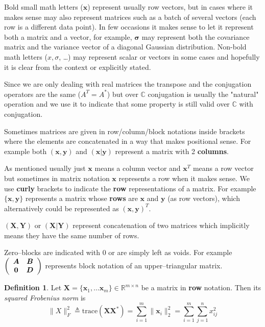 \documentclass[11pt, a4paper]{report}
\theoremstyle{plain}
\theoremstyle{definition}
\newtheorem{mydef}{Definition}[chapter]
\theoremstyle{remark}
\newcommand{\C}{\mathbb{C}}
\newcommand{\R}{\mathbb{R}}
\newcommand{\X}{\mathbf{X}}
\newcommand{\x}{\mathbf{x}}
\newcommand{\Y}{\mathbf{Y}}
\newcommand{\y}{\mathbf{y}}
\newcommand{\bv}[1]{\boldsymbol{#1}}
\begin{document}
Bold small math letters ($\bv{x}$) represent usually row vectors, but in cases
where it makes sense may also represent matrices such as a batch of several
vectors (each row is a different data point). In few occasions it makes sense to
let it represent both a matrix and a vector, for example, $\bv{\sigma}$ may
represent both the covariance matrix and the variance vector of a diagonal
Gaussian distribution. Non-bold math letters ($x, \sigma$, \dots) may represent
scalar or vectors in some cases and hopefully it is clear from the context or
explicitly stated.

Since we are only dealing with real matrices the transpose and the conjugation
operators are the same ($A^T = A^*$) but over $\C$ conjugation is
usually the "natural" operation and we use it to indicate that some property is
still valid over $\C$ with conjugation.

Sometimes matrices are given in row/column/block notations inside brackets where
the elements are concatenated in a way that makes positional sense.
For example
both $(\x,\y)$ and $(\x | \y)$ represent a matrix with 2 \textbf{columns}.

As mentioned usually just $\x$ means a column vector and $\x^T$ means a row
vector but sometimes in matrix notation $\x$ represents a row when it makes
sense.
We use \textbf{curly} brackets to indicate the \textbf{row} representations of a matrix.
For example $\{\x, \y\}$ represents a matrix whose \textbf{rows} are $\x$ and $\y$
(as row vectors), which alternatively could be represented as
$(\x, \y)^T$.

$(\X,\Y)$ or $(\X | \Y)$ represent
concatenation of two matrices which implicitly means they have the same number
of rows.

Zero--blocks are indicated with $0$ or are simply left as voids. For
example $ \left( \begin{array}{c c} \bv{A} & \bv{B} \\ \bv{0} & \bv{D}
\end{array} \right) $ represents block notation of an upper--triangular matrix.

\begin{mydef}
Let $\X = \{\x_1, \dots \x_m\} \in \R^{m \times n}$
be a matrix in \textbf{row} notation. Then its \emph{squared Frobenius norm} is
\begin{equation}
\label{def:frobnorm}
\|X\|_F^2 \triangleq \text{trace}(\X \X^*) 
= \sum_{i=1}^{m} \|\x_i\|^2_2 = \sum_{i=1}^m \sum_{j=1}^n x_{ij}^2
\end{equation}
\end{mydef}
\end{document}
